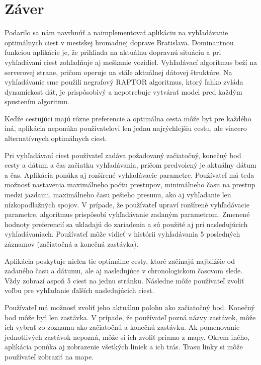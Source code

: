 \chapter*{Záver}  %

Podarilo sa nám navrhnúť a naimplementovať aplikáciu na vyhľadávanie optimálnych ciest v mestskej hromadnej doprave Bratislava. Dominantnou funkciou aplikácie je, že prihliada na aktuálnu dopravnú situáciu a pri vyhľadávaní ciest zohľadňuje aj meškanie vozidiel. Vyhľadávací algoritmus beží na serverovej strane, pričom operuje na stále aktuálnej dátovej štruktúre. Na vyhľadávanie sme použili negrafový RAPTOR algoritmus, ktorý ľahko zvláda dynamickosť dát, je prispôsobivý a nepotrebuje vytvárať model pred každým spustením algoritmu. 

Keďže cestujúci majú rôzne preferencie a optimálna cesta môže byť pre každého iná, aplikácia neponúka používateľovi len jednu najrýchlejšiu cestu, ale viacero alternatívnych optimálnych ciest. 

Pri vyhľadávaní ciest používateľ zadáva požadovaný začiatočný, konečný bod cesty a dátum a čas začiatku vyhľadávania, pričom predvolený je aktuálny dátum a čas. Aplikácia ponúka aj rozšírené vyhľadávacie parametre. Používateľ má teda možnosť nastavenia maximálneho počtu prestupov, minimálneho času na prestup medzi jazdami, maximálneho času pešieho presunu, ako aj vyhľadanie len nízkopodlažných spojov. V prípade, že používateľ upraví rozšírené vyhľadávacie parametre, algoritmus prispôsobí vyhľadávanie zadaným parametrom. Zmenené hodnoty preferencií sa ukladajú do zariadenia a sú použité aj pri nasledujúcich vyhľadávaniach. Používateľ môže vidieť v histórii vyhľadávania 5 posledných záznamov (začiatočná a konečná zastávka). 

Aplikácia poskytuje nielen tie optimálne cesty, ktoré začínajú najbližšie od zadaného času a dátumu, ale aj nasledujúce v chronologickom časovom slede. Vždy zobrazí aspoň 5 ciest na jednu stránku. Následne môže používateľ zvoliť voľbu pre vyhľadanie ďalších nasledujúcich ciest.

Používateľ má možnosť zvoliť jeho aktuálnu polohu ako začiatočný bod. Konečný bod môže byť len zastávka. V prípade, že používateľ pozná názvy zastávok, môže ich vybrať zo zoznamu ako začiatočnú a konečnú zastávku. Ak pomenovanie jednotlivých zastávok nepozná, môže si ich zvoliť priamo z mapy. Okrem iného, aplikácia ponúka aj zobrazenie všetkých liniek a ich trás. Trasu linky si môže používateľ zobraziť na mape. 


